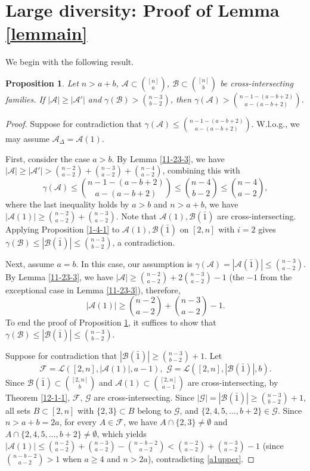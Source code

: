 \documentclass[11pt]{article}
\newcommand{\m}{\mathcal}
\newtheorem{proposition}[theorem]{Proposition}
\begin{document}
\section{Large diversity: Proof of Lemma \ref{lemmain}}\label{seclarge}
We begin with the following result. 
\begin{proposition}\label{1-4-3}
Let $n>a+b$, $\m A \subset {[n]\choose a}$, $\m B \subset {[n]\choose b}$ be cross-intersecting families. If $|\m A|\ge |\m A'|$ and 
 $\gamma(\mathcal{B})> {n-3\choose b-2}$, then $\gamma(\mathcal{A})> {n-1-(a-b+2)\choose a-(a-b+2)}$. 
\end{proposition}
\begin{proof}
 Suppose for contradiction that $\gamma(\mathcal{A})\le {n-1-(a-b+2) \choose a-(a-b+2)}$. 
 W.l.o.g., we may assume $\mathcal{A}_{\Delta}=\mathcal{A}(1)$. 
 
 First, consider the case $a>b$. 
 By Lemma \ref{11-23-3},
 we have $|\m A|\ge |\m A'|> {n-2\choose a-2}+{n-3\choose a-2}+{n-4\choose a-2}$, combining this with  
  $$\gamma(\mathcal{A})\le {n-1-(a-b+2) \choose a-(a-b+2)}\le {n-4 \choose b-2}\le {n-4 \choose a-2},$$ where the last inequality holds by $a>b$ and $n>a+b$, we  have 
$|\mathcal{A}(1)|\ge{n-2\choose a-2}+{n-3\choose a-2}$.
Note that $\m A(1), \m B(\bar1)$ are cross-intersecting.
Applying Proposition \ref{1-4-1} to $\m A(1), \m B(\bar1)$ on $[2,n]$ with $i=2$ gives $\gamma(\mathcal{B})\le |\mathcal{B}(\bar{1})|\le{n-3\choose b-2}$, a contradiction.

Next, assume $a=b$. In this case, our assumption is $\gamma(\mathcal{A})=|\m A(\bar{1})|\le {n-3 \choose a-2}$. 
By Lemma \ref{11-23-3}, we have $|\m A|\ge {n-2\choose a-2}+2{n-3\choose a-2}-1$ (the $-1$ from the exceptional case in Lemma \ref{11-23-3}), therefore, 
\begin{equation}\label{a1upper}
    |\mathcal{A}(1)|\ge{n-2\choose a-2}+{n-3\choose a-2}-1.
\end{equation} 
To end the proof of Proposition \ref{1-4-3}, it suffices to
show that $\gamma(\mathcal{B})\le |\mathcal{B}(\bar{1})|\le{n-3\choose b-2}$. 

Suppose for contradiction that $ |\mathcal{B}(\bar{1})|\ge{n-3\choose b-2}+1$.
Let 
$$\m F=\m L([2,n], |\m A(1)|, a-1), \,\,\m G=\m L([2,n],|\m B(\bar{1})|,b).$$ 
Since $\m B(\bar{1})\subset {[2,n]\choose b}$ and $\m A(1)\subset {[2,n]\choose a-1}$ are cross-intersecting,
by Theorem \ref{12-1-1}, $\m F, \, \m G$ are cross-intersecting. 
Since $|\m G|=|\m B(\bar1)|\ge {n-3\choose b-2}+1$,
all sets $B\subset [2,n]$ with $\{2,3\}\subset B$ belong to $\m G$, and $\{2,4, 5, \dots, b+2\}\in \m G$. 
Since $n>a+b=2a$, for every $A\in \m F$, we have  $A\cap \{2,3\}\ne \emptyset$ and $A\cap \{2,4,5,\dots,b+2\}\ne \emptyset$, which yields 
$|\mathcal{A}(1)|\le {n-2\choose a-2}+{n-3\choose a-2}-{n-b-2\choose a-2}<{n-2\choose a-2}+{n-3\choose a-2}-1$ (since ${n-b-2\choose a-2}>1$ when $a\ge 4$ and $n>2a$), contradicting \eqref{a1upper}. 
\end{proof}
\end{document}
